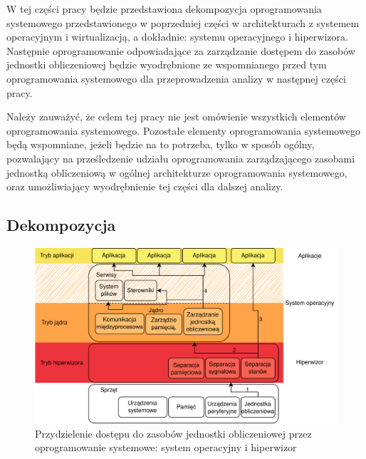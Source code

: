 \documentclass[../../main]{subfiles}
\begin{document}
W tej części pracy będzie przedstawiona dekompozycja oprogramowania systemowego przedstawionego w poprzedniej części w architekturach z systemem operacyjnym i wirtualizacją, a dokładnie: systemu operacyjnego i hiperwizora. Następnie oprogramowanie odpowiadające za zarządzanie dostępem do zasobów jednostki obliczeniowej będzie wyodrębnione ze wspomnianego przed tym oprogramowania systemowego dla przeprowadzenia analizy w następnej części pracy.

Należy zauważyć, że celem tej pracy nie jest omówienie wszystkich elementów oprogramowania systemowego. Pozostałe elementy oprogramowania systemowego będą wspomniane, jeżeli będzie na to potrzeba, tylko w sposób ogólny, pozwalający na prześledzenie udziału oprogramowania zarządzającego zasobami jednostką obliczeniową w ogólnej architekturze oprogramowania systemowego, oraz umożliwiający wyodrębnienie tej części dla dalszej analizy. %

\subsection{Dekompozycja}
\begin{figure}[h]
    \centering
    \includegraphics[width=\textwidth]{Images/cpu-resources-multiplexing.png}
    \caption{Przydzielenie dostępu do zasobów jednostki obliczeniowej przez oprogramowanie systemowe: system operacyjny i hiperwizor}
    \label{fig:cpu-resources-mult}
\end{figure}
\end{document}
